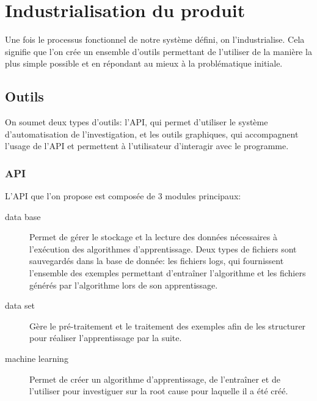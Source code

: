 \chapter{Industrialisation du produit}
\label{Industrialisation du produit}
\thispagestyle{fancy}
Une fois le processus fonctionnel de notre système défini, on l'industrialise. Cela signifie que l'on crée un ensemble d'outils permettant de l'utiliser de la manière la plus simple possible et en répondant au mieux à la problématique initiale. 

\section{Outils}
\label{Industrialisation du produit: Outils}
On soumet deux types d'outils: l'API, qui permet d'utiliser le système d'automatisation de l'investigation, et les outils graphiques, qui accompagnent l'usage de l'API et permettent à l'utilisateur d'interagir avec le programme.  

\subsection{API}
\label{Industrialisation du produit: Outils: API}
L'API que l'on propose est composée de 3 modules principaux:
\begin{description}
	\item [data base] Permet de gérer le stockage et la lecture des données nécessaires à l'exécution des algorithmes d'apprentissage. Deux types de fichiers sont sauvegardés dans la base de donnée: les fichiers logs, qui fournissent l'ensemble des exemples permettant d'entraîner l'algorithme et les fichiers générés par l'algorithme lors de son apprentissage.
	\item [data set] Gère le pré-traitement et le traitement des exemples afin de les structurer pour réaliser l'apprentissage par la suite.
	\item [machine learning] Permet de créer un algorithme d'apprentissage, de l'entraîner et de l'utiliser pour investiguer sur la root cause pour laquelle il a été créé.
\end{description}

